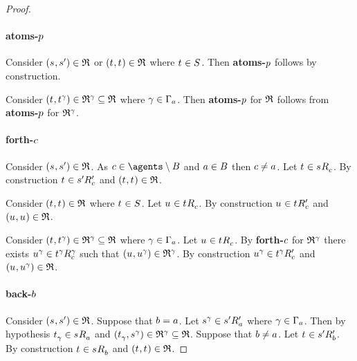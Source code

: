 \begin{proof}
\paragraph{atoms-$\atomP$}
Consider $(\kStateS, \kStateSP) \in \refinement$ or $(\kStateT, \kStateT) \in \refinement$ where $\kStateT \in \kStates$.
Then {\bf atoms-$\atomP$} follows by construction.

Consider $(\kStateT, \kStateT[\gamma]) \in \refinement^\gamma \subseteq \refinement$ where $\gamma \in \Gamma_\agentA$.
Then {\bf atoms-$\atomP$} for $\refinement$ follows from {\bf atoms-$\atomP$} for $\refinement^\gamma$.

\paragraph{forth-$\agentC$}
Consider $(\kStateS, \kStateSP) \in \refinement$.
As $\agentC \in \agents \setminus \agentsB$ and $\agentA \in \agentsB$ then $\agentC \neq \agentA$.
Let $\kStateT \in \kSuccessorsC{\kStateS}$.
By construction $\kStateT \in \kSuccessorsPC{\kStateSP}$ and $(\kStateT, \kStateT) \in \refinement$.

Consider $(\kStateT, \kStateT) \in \refinement$ where $\kStateT \in \kStates$.
Let $\kStateU \in \kSuccessorsC{\kStateT}$.
By construction $\kStateU \in \kSuccessorsPC{\kStateT}$ and $(\kStateU, \kStateU) \in \refinement$.

Consider $(\kStateT, \kStateT[\gamma]) \in \refinement^\gamma \subseteq \refinement$ where $\gamma \in \Gamma_\agentA$.
Let $\kStateU \in \kSuccessorsC{\kStateT}$.
By {\bf forth-$\agentC$} for $\refinement^\gamma$ there exists $\kStateU[\gamma] \in \kSuccessorsC[\gamma]{\kStateT[\gamma]}$ such that $(\kStateU, \kStateU[\gamma]) \in \refinement^\gamma$.
By construction $\kStateU[\gamma] \in \kSuccessorsPC{\kStateT[\gamma]}$ and $(\kStateU, \kStateU[\gamma]) \in \refinement$.

\paragraph{back-$\agentB$}

Consider $(\kStateS, \kStateSP) \in \refinement$.
Suppose that $\agentB = \agentA$.
Let $\kStateS[\gamma] \in \kSuccessorsPA{\kStateSP}$ where $\gamma \in \Gamma_\agentA$.
Then by hypothesis $\kStateT_\gamma \in \kSuccessorsA{\kStateS}$ and $(\kStateT_\gamma, \kStateS[\gamma]) \in \refinement^\gamma \subseteq \refinement$.
Suppose that $\agentB \neq \agentA$.
Let $\kStateT \in \kSuccessorsPB{\kStateSP}$.
By construction $\kStateT \in \kSuccessorsB{\kStateS}$ and $(\kStateT, \kStateT) \in \refinement$.


\end{proof}
